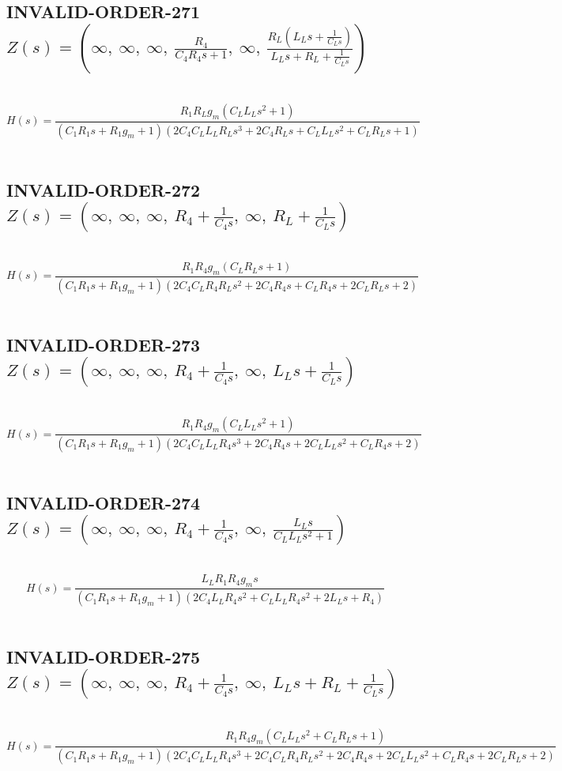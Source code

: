 \documentclass{article}
\begin{document}
\subsection{INVALID-ORDER-271 $Z(s) = \left( \infty, \  \infty, \  \infty, \  \frac{R_{4}}{C_{4} R_{4} s + 1}, \  \infty, \  \frac{R_{L} \left(L_{L} s + \frac{1}{C_{L} s}\right)}{L_{L} s + R_{L} + \frac{1}{C_{L} s}}\right)$ } \ 
\textbf{\[H(s) = \frac{R_{1} R_{L} g_{m} \left(C_{L} L_{L} s^{2} + 1\right)}{\left(C_{1} R_{1} s + R_{1} g_{m} + 1\right) \left(2 C_{4} C_{L} L_{L} R_{L} s^{3} + 2 C_{4} R_{L} s + C_{L} L_{L} s^{2} + C_{L} R_{L} s + 1\right)}\] } \ 
\subsection{INVALID-ORDER-272 $Z(s) = \left( \infty, \  \infty, \  \infty, \  R_{4} + \frac{1}{C_{4} s}, \  \infty, \  R_{L} + \frac{1}{C_{L} s}\right)$ } \ 
\textbf{\[H(s) = \frac{R_{1} R_{4} g_{m} \left(C_{L} R_{L} s + 1\right)}{\left(C_{1} R_{1} s + R_{1} g_{m} + 1\right) \left(2 C_{4} C_{L} R_{4} R_{L} s^{2} + 2 C_{4} R_{4} s + C_{L} R_{4} s + 2 C_{L} R_{L} s + 2\right)}\] } \ 
\subsection{INVALID-ORDER-273 $Z(s) = \left( \infty, \  \infty, \  \infty, \  R_{4} + \frac{1}{C_{4} s}, \  \infty, \  L_{L} s + \frac{1}{C_{L} s}\right)$ } \ 
\textbf{\[H(s) = \frac{R_{1} R_{4} g_{m} \left(C_{L} L_{L} s^{2} + 1\right)}{\left(C_{1} R_{1} s + R_{1} g_{m} + 1\right) \left(2 C_{4} C_{L} L_{L} R_{4} s^{3} + 2 C_{4} R_{4} s + 2 C_{L} L_{L} s^{2} + C_{L} R_{4} s + 2\right)}\] } \ 
\subsection{INVALID-ORDER-274 $Z(s) = \left( \infty, \  \infty, \  \infty, \  R_{4} + \frac{1}{C_{4} s}, \  \infty, \  \frac{L_{L} s}{C_{L} L_{L} s^{2} + 1}\right)$ } \ 
\textbf{\[H(s) = \frac{L_{L} R_{1} R_{4} g_{m} s}{\left(C_{1} R_{1} s + R_{1} g_{m} + 1\right) \left(2 C_{4} L_{L} R_{4} s^{2} + C_{L} L_{L} R_{4} s^{2} + 2 L_{L} s + R_{4}\right)}\] } \ 
\subsection{INVALID-ORDER-275 $Z(s) = \left( \infty, \  \infty, \  \infty, \  R_{4} + \frac{1}{C_{4} s}, \  \infty, \  L_{L} s + R_{L} + \frac{1}{C_{L} s}\right)$ } \ 
\textbf{\[H(s) = \frac{R_{1} R_{4} g_{m} \left(C_{L} L_{L} s^{2} + C_{L} R_{L} s + 1\right)}{\left(C_{1} R_{1} s + R_{1} g_{m} + 1\right) \left(2 C_{4} C_{L} L_{L} R_{4} s^{3} + 2 C_{4} C_{L} R_{4} R_{L} s^{2} + 2 C_{4} R_{4} s + 2 C_{L} L_{L} s^{2} + C_{L} R_{4} s + 2 C_{L} R_{L} s + 2\right)}\] } \ 
\end{document}
